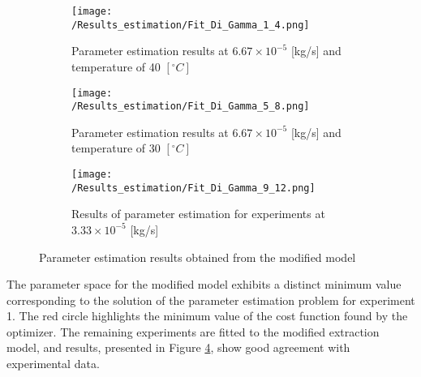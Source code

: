 \documentclass[../Supercritical_fluid_extraction_of_essential_oil_from_chamomile.tex]{subfiles}
\begin{document}
	\begin{figure}[!h]
		\centering
		\begin{subfigure}{0.66\columnwidth}
			\centering
			\texttt{[image: /Results\_estimation/Fit\_Di\_Gamma\_1\_4.png]}
			\caption{Parameter estimation results at $6.67\times 10^{-5}$ [kg/s] and temperature of 40 $[^\circ C]$}
			\label{fig: Fit_1_4_Di_Gamma}
		\end{subfigure}
		\hfill
		\begin{subfigure}{0.66\columnwidth}
			\centering
			\texttt{[image: /Results\_estimation/Fit\_Di\_Gamma\_5\_8.png]}
			\caption{Parameter estimation results at $6.67\times 10^{-5}$ [kg/s] and temperature of 30 $[^\circ C]$}
			\label{fig: Fit_5_8_Di_Gamma}
		\end{subfigure}
		\hfill
		\begin{subfigure}{0.66\columnwidth}
			\centering
			\texttt{[image: /Results\_estimation/Fit\_Di\_Gamma\_9\_12.png]}
			\caption{Results of parameter estimation for experiments at $3.33\times 10^{-5}$ [kg/s]}
			\label{fig: Fit_9_12_Di_Gamma}
		\end{subfigure}
		\caption{Parameter estimation results obtained from the modified model}
		\label{fig: Fit_Di_Gamma}
	\end{figure}
	
	The parameter space for the modified model exhibits a distinct minimum value corresponding to the solution of the parameter estimation problem for experiment 1. The red circle highlights the minimum value of the cost function found by the optimizer. The remaining experiments are fitted to the modified extraction model, and results, presented in Figure \ref{fig: Fit_Di_Gamma}, show good agreement with experimental data. 
			
\end{document}
